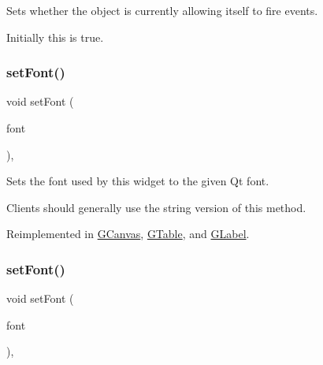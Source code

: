 Sets whether the object is currently allowing itself to fire events. 

Initially this is true. \mbox{\label{classsgl_1_1GInteractor_a2592348886ffea646c6534bf88f7c49d}} 
\subsubsection{\texorpdfstring{set\+Font()}{setFont()}\hspace{0.1cm}{\footnotesize\ttfamily [1/2]}}
{\footnotesize\ttfamily void set\+Font (\begin{DoxyParamCaption}\item[{const Q\+Font \&}]{font }\end{DoxyParamCaption})\hspace{0.3cm}{\ttfamily [virtual]}, {\ttfamily [inherited]}}



Sets the font used by this widget to the given Qt font. 

Clients should generally use the string version of this method. 

Reimplemented in \mbox{\hyperlink{classsgl_1_1GCanvas_ad1d75b3840a41ba7d1e8a921696dc684}{G\+Canvas}}, \mbox{\hyperlink{classsgl_1_1GTable_ad1d75b3840a41ba7d1e8a921696dc684}{G\+Table}}, and \mbox{\hyperlink{classsgl_1_1GLabel_ad1d75b3840a41ba7d1e8a921696dc684}{G\+Label}}.

\mbox{\label{classsgl_1_1GInteractor_a8e096e8818d838aceae1d46d58fb3a7b}} 
\subsubsection{\texorpdfstring{set\+Font()}{setFont()}\hspace{0.1cm}{\footnotesize\ttfamily [2/2]}}
{\footnotesize\ttfamily void set\+Font (\begin{DoxyParamCaption}\item[{const std\+::string \&}]{font }\end{DoxyParamCaption})\hspace{0.3cm}{\ttfamily [virtual]}, {\ttfamily [inherited]}}



